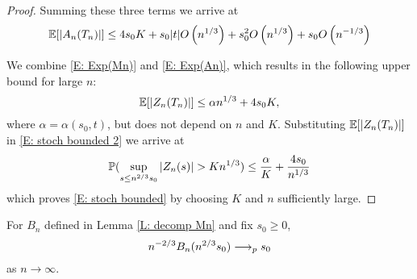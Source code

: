 \begin{proof}
    Summing these three terms we arrive at
    \begin{equation} \label{E: Exp(An)}
    \mathbb{E}[|A_n(T_n)|] \leq 4 s_0 K + s_0|t|O\left(n^{1 / 3}\right) + s_0^2O\left(n^{1 / 3}\right) + s_0O\left(n^{-1 / 3}\right)
    \end{equation}
    
    We combine \eqref{E: Exp(Mn)} and \eqref{E: Exp(An)}, 
    which results in the following upper bound for large $n$:
    \begin{equation} \label{E: bound Zn}
    \mathbb{E}[|Z_n(T_n)|] \leq \alpha n^{1 / 3} + 4s_0K,
    \end{equation}
    where $\alpha = \alpha(s_0,t)$, but does not depend on $n$ and $K$. 
    Substituting $\mathbb{E}[|Z_n(T_n)|]$ in \eqref{E: stoch bounded 2} we arrive at
    \begin{equation}
    \mathbb{P}( \sup_{s\leq n^{2/3} s_0} |Z_n(s)| > K n^{1 / 3} ) \leq \frac{\alpha}{K} + \frac{4s_0}{n^{1 / 3}}
    \end{equation}
    which proves \eqref{E: stoch bounded} by choosing $K$ and $n$ sufficiently large.
\end{proof}


\begin{lemma} \label{L: limit Bn}
	For $B_n$ defined in Lemma \ref{L: decomp Mn} and fix $s_0 \geq 0$,
	\begin{equation} \label{E: limit Bn}
	n^{-2 / 3} B_n(n^{2 / 3}s_0) \longrightarrow_p s_0
	\end{equation}
	as $n \rightarrow \infty$.
\end{lemma}


